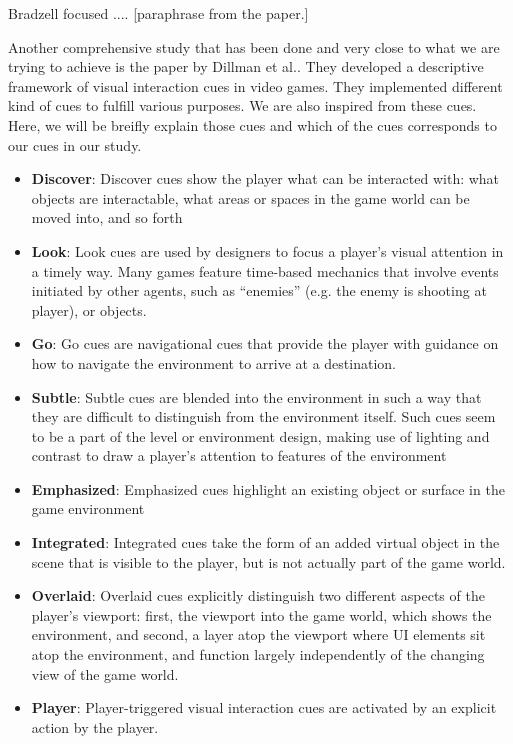 \documentclass[conference]{IEEEtran}
\begin{document}
Bradzell focused .... [paraphrase from the paper.] 

Another comprehensive study that has been done and very close to what we are trying to achieve is the paper by Dillman et al.. They developed a descriptive framework of visual interaction cues in video games. They implemented different kind of cues to fulfill various purposes. We are also inspired from these cues. Here, we will be breifly explain those cues and which of the cues corresponds to our cues in our study.

\begin{itemize}
    \item \textbf{Discover}: Discover cues show the player what can be interacted with: what objects are interactable, what areas or spaces in the game world can be moved into, and so forth
    \item \textbf{Look}: Look cues are used by designers to focus a player’s visual attention in a timely way. Many games feature time-based mechanics that involve events initiated by other agents, such as “enemies” (e.g. the enemy is shooting at player), or objects.
    \item \textbf{Go}: Go cues are navigational cues that provide the player with guidance on how to navigate the environment to arrive at a destination.
    \item \textbf{Subtle}: Subtle cues are blended into the environment in such a way that they are difficult to distinguish from the environment itself. Such cues seem to be a part of the level or environment design, making use of lighting and contrast to draw a player’s attention to features of the environment
    \item \textbf{Emphasized}: Emphasized cues highlight an existing object or surface in the game environment
    \item \textbf{Integrated}: Integrated cues take the form of an added virtual object in the scene that is visible to the player, but is not actually part of the game world.
    \item \textbf{Overlaid}: Overlaid cues explicitly distinguish two different aspects of the player’s viewport: first, the viewport into the game world, which shows the environment, and second, a layer atop the viewport where UI elements sit atop the environment, and function largely independently of the changing view of the game world.
    \item \textbf{Player}: Player-triggered visual interaction cues are activated by an explicit action by the player.

\end{itemize}
\end{document}
